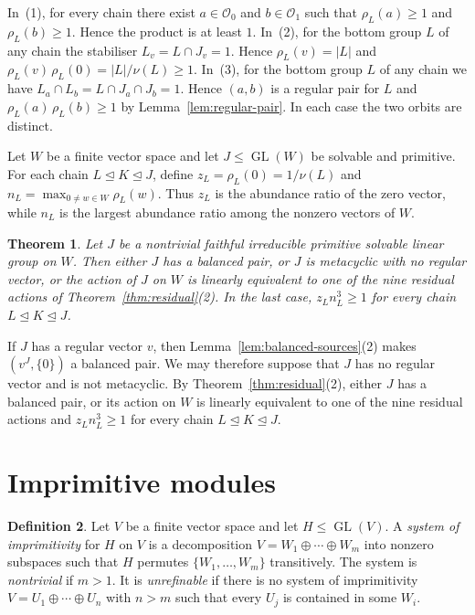 \documentclass[10pt]{amsart}
\newtheorem{theorem}{Theorem}[section]
\theoremstyle{definition}
\newtheorem{definition}[theorem]{Definition}
\renewcommand{\ge}{\geqslant}
\renewcommand{\leq}{\leqslant}
\renewcommand{\geq}{\geqslant}
\let\oldendproof\endproof
\renewenvironment{proof}[1][\proofname]{%
  \oldproof[\bfseries #1]%
}{\oldendproof}
\newcommand{\orbit}{\mathcal{O}}
\DeclareMathOperator{\GL}{GL}
\numberwithin{equation}{section}
\numberwithin{table}{section}
\begin{document}
\begin{proof}
In~(1), for every chain there exist $a\in\orbit_0$ and $b\in\orbit_1$ such
that $\rho_L(a)\ge1$ and $\rho_L(b)\ge1$. Hence the product is at least $1$. In~(2), for the bottom group $L$ of any chain the
stabiliser $L_v=L\cap J_v=1$. Hence $\rho_L(v)=|L|$ and
$\rho_L(v)\,\rho_L(0)=|L|/\nu(L)\ge1$. In~(3), for the bottom group $L$ of any chain we have
$L_a\cap L_b=L\cap J_a\cap J_b=1$. Hence $(a,b)$ is a regular pair for $L$ and
$\rho_L(a)\,\rho_L(b)\ge1$ by Lemma~\ref{lem:regular-pair}. In each case
the two orbits are distinct.
\end{proof}

Let $W$ be a finite vector space and let $J\leq\GL(W)$ be solvable and
primitive. For each chain $L\trianglelefteq K\trianglelefteq J$, define
$z_L=\rho_L(0)=1/\nu(L)$ and $n_L=\max_{0\ne w\in W}\rho_L(w)$. Thus $z_L$
is the abundance ratio of the zero vector, while $n_L$ is the largest
abundance ratio among the nonzero vectors of $W$.

\begin{theorem}\label{thm:local-alternatives}
Let $J$ be a nontrivial faithful irreducible primitive solvable linear group on
$W$. Then either $J$ has a balanced pair, or $J$ is metacyclic with no regular
vector, or the action of $J$ on $W$ is linearly equivalent to one of the nine residual actions of
Theorem~\ref{thm:residual}\textup{(2)}. In the last case,
$z_Ln_L^3\geq1$ for every chain $L\trianglelefteq K\trianglelefteq J$.
\end{theorem}

\begin{proof}
If $J$ has a regular vector $v$, then Lemma~\ref{lem:balanced-sources}(2)
makes $(v^J,\{0\})$ a balanced pair. We may therefore suppose that $J$ has no
regular vector and is not metacyclic. By
Theorem~\ref{thm:residual}\textup{(2)}, either $J$ has a balanced pair,
or its action on $W$ is linearly equivalent to one of the nine residual actions and
$z_Ln_L^3\geq1$ for every chain $L\trianglelefteq K\trianglelefteq J$.
\end{proof}

\section{Imprimitive modules}
\label{sec:imprimitive}

\begin{definition}\label{def:unrefinable}
Let $V$ be a finite vector space and let $H\leq\GL(V)$. A {\it system of
imprimitivity} for $H$ on $V$ is a decomposition
$V=W_1\oplus\cdots\oplus W_m$ into nonzero subspaces such that $H$ permutes
$\{W_1,\ldots,W_m\}$
transitively. The system is {\it nontrivial} if $m>1$. It is {\it
unrefinable} if there is no system of imprimitivity
$V=U_1\oplus\cdots\oplus U_n$ with $n>m$ such that every $U_j$ is
contained in some $W_i$.
\end{definition}
\end{document}
